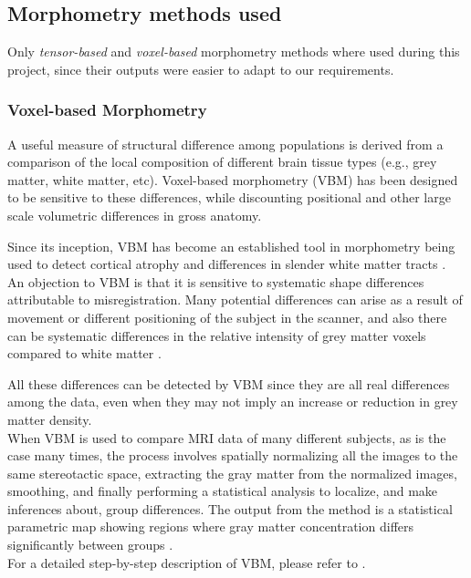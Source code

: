 \subsection{Morphometry methods used}
\label{sec:morph_methods}
Only \textit{tensor-based} and \textit{voxel-based} morphometry
methods where used during this project, since their outputs were
easier to adapt to our requirements.


\subsubsection{Voxel-based Morphometry}
A useful measure of structural difference among populations is derived
from a comparison of the local composition of different brain tissue
types (e.g., grey matter, white matter, etc). Voxel-based morphometry
(VBM) has been designed to be sensitive to these differences, while
discounting positional and other large scale volumetric differences in
gross anatomy.

Since its inception, VBM has become an established tool in morphometry
being used to detect cortical atrophy and differences in slender white
matter tracts \cite{ashburner}.\\

An objection to VBM is that it is sensitive to systematic shape
differences attributable to misregistration. Many potential
differences can arise as a result of movement or different positioning
of the subject in the scanner, and also there can be systematic
differences in the relative intensity of grey matter voxels compared
to white matter \cite{ashburner}.

All these differences can be detected by VBM since they are all real
differences among the data, even when they may not imply an increase
or reduction in grey matter density.\\

When VBM is used to compare MRI data of many different subjects, as is
the case many times, the process involves spatially normalizing all
the images to the same stereotactic space, extracting the gray matter
from the normalized images, smoothing, and finally performing a
statistical analysis to localize, and make inferences about, group
differences. The output from the method is a statistical parametric
map showing regions where gray matter concentration differs
significantly between groups \cite{ashburner2}.\\


For a detailed step-by-step description of VBM, please refer to
\cite{ashburner2}.

